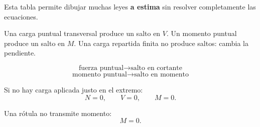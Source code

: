 \begin{tip}
Esta tabla permite dibujar muchas leyes \textbf{a estima} sin resolver completamente las ecuaciones.
\end{tip}

Una carga puntual transversal produce un salto en $V$. Un momento puntual produce un salto en $M$. Una carga repartida finita no produce saltos: cambia la pendiente.

\[
\text{fuerza puntual}\longrightarrow\text{salto en cortante}
\]
\[
\text{momento puntual}\longrightarrow\text{salto en momento}
\]


Si no hay carga aplicada justo en el extremo:
\[
N=0,\qquad V=0,\qquad M=0.
\]

Una rótula no transmite momento:
\[
M=0.
\]
